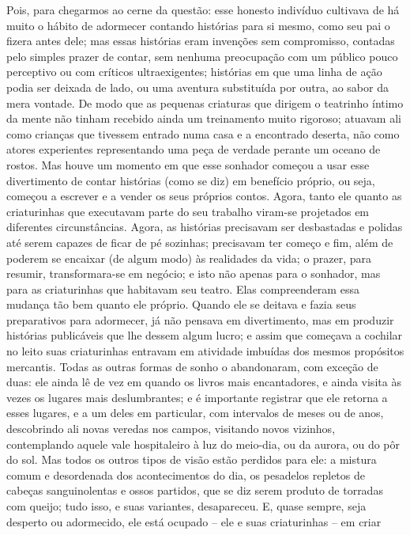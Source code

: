 Pois, para chegarmos ao cerne da questão: esse honesto indivíduo
cultivava de há muito o hábito de adormecer contando histórias para si
mesmo, como seu pai o fizera antes dele; mas essas histórias eram
invenções sem compromisso, contadas pelo simples prazer de contar, sem
nenhuma preocupação com um público pouco perceptivo ou com críticos
ultraexigentes; histórias em que uma linha de ação podia ser deixada
de lado, ou uma aventura substituída por outra, ao sabor da mera
vontade.  De modo que as pequenas criaturas que dirigem o teatrinho
íntimo da mente não tinham recebido ainda um treinamento muito
rigoroso; atuavam ali como crianças que tivessem entrado numa casa e a
encontrado deserta, não como atores experientes representando uma peça
de verdade perante um oceano de rostos.  Mas houve um momento em que
esse sonhador começou a usar esse divertimento de contar histórias
(como se diz) em benefício próprio, ou seja, começou a escrever e a
vender os seus próprios contos.  Agora, tanto ele quanto as
criaturinhas que executavam parte do seu trabalho viram-se projetados
em diferentes circunstâncias.  Agora, as histórias precisavam ser
desbastadas e polidas até serem capazes de ficar de pé sozinhas;
precisavam ter começo e fim, além de poderem se encaixar (de algum
modo) às realidades da vida; o prazer, para resumir, transformara-se em
negócio; e isto não apenas para o sonhador, mas para as criaturinhas
que habitavam seu teatro.  Elas compreenderam essa mudança tão bem
quanto ele próprio.  Quando ele se deitava e fazia seus preparativos
para adormecer, já não pensava em divertimento, mas em produzir
histórias publicáveis que lhe dessem algum lucro; e assim que começava
a cochilar no leito suas criaturinhas entravam em atividade imbuídas
dos mesmos propósitos mercantis.  Todas as outras formas de sonho o
abandonaram, com exceção de duas: ele ainda lê de vez em quando os
livros mais encantadores, e ainda visita às vezes os lugares mais
deslumbrantes; e é importante registrar que ele retorna a esses
lugares, e a um deles em particular, com intervalos de meses ou de
anos, descobrindo ali novas veredas nos campos, visitando novos
vizinhos, contemplando aquele vale hospitaleiro à luz do meio-dia, ou
da aurora, ou do pôr do sol.  Mas todos os outros tipos de visão estão
perdidos para ele: a mistura comum e desordenada dos acontecimentos do
dia, os pesadelos repletos de cabeças sanguinolentas e ossos partidos,
que se diz serem produto de torradas com queijo; tudo isso, e suas
variantes, desapareceu.  E, quase sempre, seja desperto ou adormecido,
ele está ocupado -- ele e suas criaturinhas -- em criar
